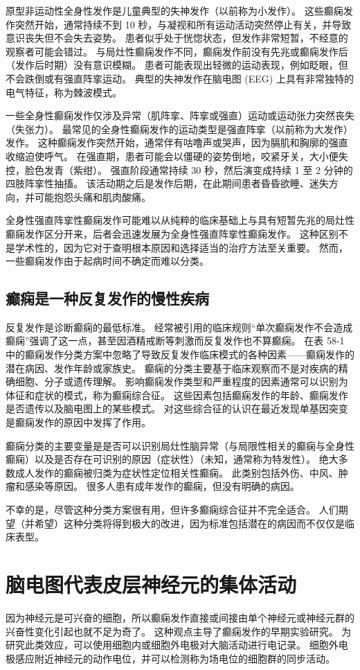 原型非运动性全身性发作是儿童典型的失神发作（以前称为小发作）。 这些癫痫发作突然开始，通常持续不到 10 秒，与凝视和所有运动活动突然停止有关，并导致意识丧失但不会失去姿势。 患者似乎处于恍惚状态，但发作非常短暂，不经意的观察者可能会错过。 与局灶性癫痫发作不同，癫痫发作前没有先兆或癫痫发作后（发作后时期）没有意识模糊。 患者可能表现出轻微的运动表现，例如眨眼，但不会跌倒或有强直阵挛运动。 典型的失神发作在脑电图 (EEG) 上具有非常独特的电气特征，称为棘波模式。

一些全身性癫痫发作仅涉及异常（肌阵挛、阵挛或强直）运动或运动张力突然丧失（失张力）。 最常见的全身性癫痫发作的运动类型是强直阵挛（以前称为大发作）发作。 这种癫痫发作突然开始，通常伴有咕噜声或哭声，因为膈肌和胸廓的强直收缩迫使呼气。 在强直期，患者可能会以僵硬的姿势倒地，咬紧牙关，大小便失控，脸色发青（紫绀）。 强直阶段通常持续 30 秒，然后演变成持续 1 至 2 分钟的四肢阵挛性抽搐。 该活动期之后是发作后期，在此期间患者昏昏欲睡、迷失方向，并可能抱怨头痛和肌肉酸痛。

全身性强直阵挛性癫痫发作可能难以从纯粹的临床基础上与具有短暂先兆的局灶性癫痫发作区分开来，后者会迅速发展为全身性强直阵挛性癫痫发作。 这种区别不是学术性的，因为它对于查明根本原因和选择适当的治疗方法至关重要。 然而，一些癫痫发作由于起病时间不确定而难以分类。


\subsection{癫痫是一种反复发作的慢性疾病}
反复发作是诊断癫痫的最低标准。 经常被引用的临床规则“单次癫痫发作不会造成癫痫”强调了这一点，甚至因酒精戒断等刺激而反复发作也不算癫痫。 在表 58-1 中的癫痫发作分类方案中忽略了导致反复发作临床模式的各种因素——癫痫发作的潜在病因、发作年龄或家族史。 癫痫的分类主要基于临床观察而不是对疾病的精确细胞、分子或遗传理解。 影响癫痫发作类型和严重程度的因素通常可以识别为体征和症状的模式，称为癫痫综合征。 这些因素包括癫痫发作的年龄、癫痫发作是否遗传以及脑电图上的某些模式。 对这些综合征的认识在最近发现单基因突变是癫痫发作的原因中发挥了作用。

癫痫分类的主要变量是是否可以识别局灶性脑异常（与局限性相关的癫痫与全身性癫痫）以及是否存在可识别的原因（症状性）（未知，通常称为特发性）。 绝大多数成人发作的癫痫被归类为症状性定位相关性癫痫。 此类别包括外伤、中风、肿瘤和感染等原因。 很多人患有成年发作的癫痫，但没有明确的病因。

不幸的是，尽管这种分类方案很有用，但许多癫痫综合征并不完全适合。 人们期望（并希望）这种分类将得到极大的改进，因为标准包括潜在的病因而不仅仅是临床表型。


\section{脑电图代表皮层神经元的集体活动}
因为神经元是可兴奋的细胞，所以癫痫发作直接或间接由单个神经元或神经元群的兴奋性变化引起也就不足为奇了。 这种观点主导了癫痫发作的早期实验研究。 为研究此类效应，可以使用细胞内或细胞外电极对大脑活动进行电记录。 细胞外电极感应附近神经元的动作电位，并可以检测称为场电位的细胞群的同步活动。

